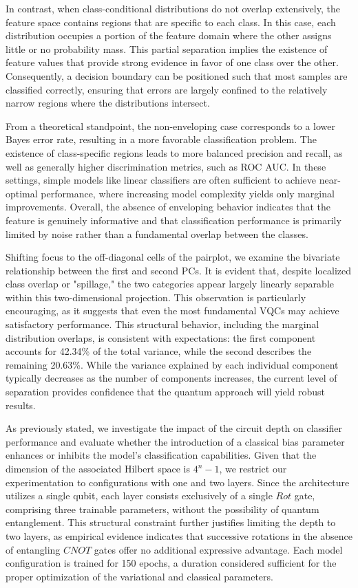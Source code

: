 \documentclass[en]{dimscthesis}
\begin{document}
In contrast, when class-conditional distributions do not overlap extensively, the feature space contains regions that are specific to each class. In this case, each distribution occupies a portion of the feature domain where the other assigns little or no probability mass. This partial separation implies the existence of feature values that provide strong evidence in favor of one class over the other. Consequently, a decision boundary can be positioned such that most samples are classified correctly, ensuring that errors are largely confined to the relatively narrow regions where the distributions intersect.

From a theoretical standpoint, the non-enveloping case corresponds to a lower Bayes error rate, resulting in a more favorable classification problem. The existence of class-specific regions leads to more balanced precision and recall, as well as generally higher discrimination metrics, such as ROC AUC. In these settings, simple models like linear classifiers are often sufficient to achieve near-optimal performance, where increasing model complexity yields only marginal improvements. Overall, the absence of enveloping behavior indicates that the feature is genuinely informative and that classification performance is primarily limited by noise rather than a fundamental overlap between the classes.

Shifting focus to the off-diagonal cells of the pairplot, we examine the bivariate relationship between the first and second PCs. It is evident that, despite localized class overlap or "spillage," the two categories appear largely linearly separable within this two-dimensional projection. This observation is particularly encouraging, as it suggests that even the most fundamental VQCs may achieve satisfactory performance. This structural behavior, including the marginal distribution overlaps, is consistent with expectations: the first component accounts for 42.34\% of the total variance, while the second describes the remaining 20.63\%. While the variance explained by each individual component typically decreases as the number of components increases, the current level of separation provides confidence that the quantum approach will yield robust results.

As previously stated, we investigate the impact of the circuit depth on classifier performance and evaluate whether the introduction of a classical bias parameter enhances or inhibits the model's classification capabilities. Given that the dimension of the associated Hilbert space is $4^n-1$, we restrict our experimentation to configurations with one and two layers. Since the architecture utilizes a single qubit, each layer consists exclusively of a single $Rot$ gate, comprising three trainable parameters, without the possibility of quantum entanglement. This structural constraint further justifies limiting the depth to two layers, as empirical evidence indicates that successive rotations in the absence of entangling $CNOT$ gates offer no additional expressive advantage. Each model configuration is trained for 150 epochs, a duration considered sufficient for the proper optimization of the variational and classical parameters.
\end{document}
